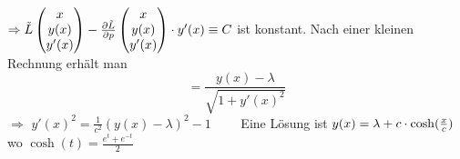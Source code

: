 \(
	\Rightarrow \tilde L \begin{pmatrix}
		x \\ y(x) \\ y'(x)
	\end{pmatrix} - \frac{{\partial \tilde L}}{{\partial p}}  \begin{pmatrix}
		x \\ y(x) \\ y'(x)
	\end{pmatrix} \cdot y'(x) \equiv C
\) ist konstant. Nach einer kleinen Rechnung erhält man 
\[
	= \frac{y(x) - \lambda }{\sqrt{1+ y'(x)^2}  } 
\]
$\Rightarrow $ $\boxed{y'(x)^2 = \frac{1}{c^2} (y(x) - \lambda )^2 -1} \qquad $ Eine Lösung ist $y(x) = \lambda + c \cdot \cosh (\frac{x}{c} ) $ wo
$\cosh(t) = \frac{e^t + e^{-t}}{2} $

\cleardoubleoddemptypage
{}
\setcounter{page}{1}
\printindex
\listoffigures

